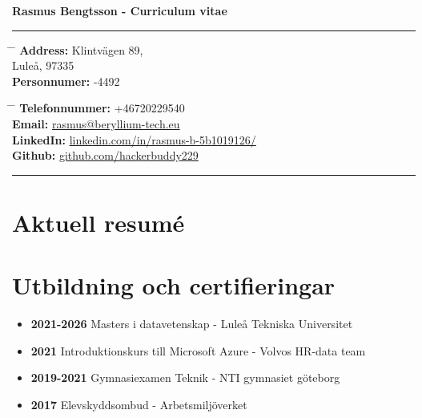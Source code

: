 \documentclass[a4paper]{article}
\begin{document}

\Large{\textbf{Rasmus Bengtsson - Curriculum vitae}}

\rule{\textwidth}{4px}



\normalsize{
\parbox{0.5\textwidth}{ %
\begin{tabbing} %
\hspace{3cm} \= \hspace{4cm} \= \kill %
{\bf Address:} \> Klintvägen 89,\\ %
\> Luleå, 97335 \\ %
{\bf Personnumer:} -4492 %
\end{tabbing}}
\hfill %
\parbox{0.5\textwidth}{ %
\begin{tabbing} %
\hspace{3cm} \= \hspace{4cm} \= \kill %
{\bf Telefonnummer:} \> +46720229540 \\ %
{\bf Email:} \> \href{mailto:rasmus@beryllium-tech.eu}{rasmus@beryllium-tech.eu} \\ %
{\bf LinkedIn:} \> \href{https://www.linkedin.com/in/rasmus-b-5b1019126/}{linkedin.com/in/rasmus-b-5b1019126/} \\ %
{\bf Github:} \> \href{https://www.github.com/hackerbuddy229}{github.com/hackerbuddy229} %
\end{tabbing}}}



\rule{0.5\textwidth}{2px}

\section{Aktuell resumé}

\section{Utbildning och certifieringar}
    \begin{itemize}
        \item{
            \textbf{2021-2026} Masters i datavetenskap - Luleå Tekniska Universitet 
        }

        \item{
            \textbf{2021} Introduktionskurs till Microsoft Azure - Volvos HR-data team 
        }

        \item{
            \textbf{2019-2021} Gymnasiexamen Teknik - NTI gymnasiet göteborg
        }

        \item{ %
            \textbf{2017} Elevskyddsombud - Arbetsmiljöverket
        }
    \end{itemize}
\end{document}
